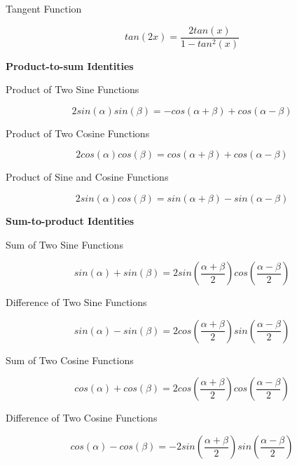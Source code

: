 \documentclass[a4paper,12pt]{article}
\begin{document}
\begin{thm}
\begin{alist}
\begin{rlist}
      \item Tangent Function

      $$tan(2x)=\frac{2tan(x)}{1-tan^{2}(x)}$$

    \end{rlist}
    \item \textbf{Product-to-sum Identities}
    \begin{rlist}
      \item Product of Two Sine Functions

      $$2sin(\alpha)sin(\beta)=-cos(\alpha +\beta)+cos(\alpha -\beta)$$

      \item Product of Two Cosine Functions

      $$2cos(\alpha)cos(\beta)=cos(\alpha +\beta)+cos(\alpha -\beta)$$

      \item Product of Sine and Cosine Functions

      $$2sin(\alpha)cos(\beta)=sin(\alpha +\beta)-sin(\alpha -\beta)$$

    \end{rlist}
    \item \textbf{Sum-to-product Identities}
    \begin{rlist}
      \item Sum of Two Sine Functions

      $$sin(\alpha)+sin(\beta)=2sin(\frac{\alpha +\beta}{2})cos(\frac{\alpha -\beta}{2})$$

      \item Difference of Two Sine Functions

      $$sin(\alpha)-sin(\beta)=2cos(\frac{\alpha +\beta}{2})sin(\frac{\alpha -\beta}{2})$$

      \item Sum of Two Cosine Functions

      $$cos(\alpha)+cos(\beta)=2cos(\frac{\alpha +\beta}{2})cos(\frac{\alpha -\beta}{2})$$

      \item Difference of Two Cosine Functions

      $$cos(\alpha)-cos(\beta)=-2sin(\frac{\alpha +\beta}{2})sin(\frac{\alpha -\beta}{2})$$

    \end{rlist}
  \end{alist}
\end{thm}
\end{document}
